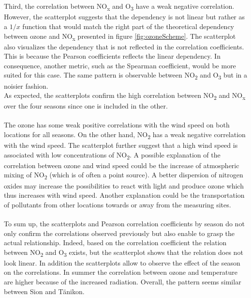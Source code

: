 \documentclass[a4paper, 12pt]{article}
\begin{document}
        \\
        \\
        Third, the correlation between NO\textsubscript{x} and O\textsubscript{3} have a weak negative correlation. However, the scatterplot suggests that the dependency is not linear but rather as a $1/x$ function that would match the right part of the theoretical dependency between ozone and NO\textsubscript{x} presented in figure \ref{fig:ozoneScheme}. The scatterplot also visualizes the dependency that is not reflected in the correlation coefficients. This is because the Pearson coefficients reflects the linear dependency. In consequence, another metric, such as the Spearman coefficient, would be more suited for this case. The same pattern is observable between NO\textsubscript{2} and O\textsubscript{3} but in a noisier fashion. 
        \\
        As expected, the scatterplots confirm the high correlation between NO\textsubscript{2} and NO\textsubscript{x} over the four seasons since one is included in the other.
        \\
        \\
        The ozone has some weak positive correlations with the wind speed on both locations for all seasons. On the other hand, NO\textsubscript{2} has a weak negative correlation with the wind speed. The scatterplot further suggest that a high wind speed is associated with low concentrations of NO\textsubscript{2}. A possible explanation of the correlation between ozone and wind speed could be the increase of atmospheric mixing of NO\textsubscript{2} (which is of often a point source). A better dispersion of nitrogen oxides may increase the possibilities to react with light and produce ozone which thus increases with wind speed. Another explanation could be the transportation of pollutants from other locations towards or away from the measuring sites. 
        \\
        \\
        To sum up, the scatterplots and Pearson correlation coefficients by season do not only confirm the correlations observed previously but also enable to grasp the actual relationship. Indeed, based on the correlation coefficient the relation between NO\textsubscript{2} and O\textsubscript{3} exists, but the scatterplot shows that the relation does not look linear. In addition the scatterplots allow to observe the effect of the season on the correlations. In summer the correlation between ozone and temperature are higher because of the increased radiation. Overall, the pattern seems similar between Sion and Tänikon. 
\end{document}
